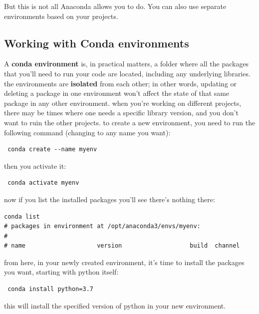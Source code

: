 But this is not all Anaconda allows you to do. You can also use separate environments based on your projects.

\subsection{Working with Conda environments}\label{subsec:conda-environments}
A \textbf{conda environment} is, in practical matters, a folder where all the packages that you'll need to run your code are located, including any underlying libraries. the environments are \textbf{isolated} from each other; in other words, updating or deleting a package in one environment won't affect the state of that same package in any other environment. when you're working on different projects, there may be times where one needs a specific library version, and you don't want to ruin the other projects. to create a new environment, you need to run the following command (changing  to any name you want):

\begin{verbatim}
 conda create --name myenv
\end{verbatim}

then you activate it:

\begin{verbatim}
 conda activate myenv
\end{verbatim}

now if you list the installed packages you'll see there's nothing there:

\begin{verbatim}
conda list
# packages in environment at /opt/anaconda3/envs/myenv:
#
# name                    version                   build  channel
\end{verbatim}

from here, in your newly created environment, it's time to install the packages you want, starting with python itself:

\begin{verbatim}
 conda install python=3.7
\end{verbatim}

this will install the specified version of python in your new environment.


